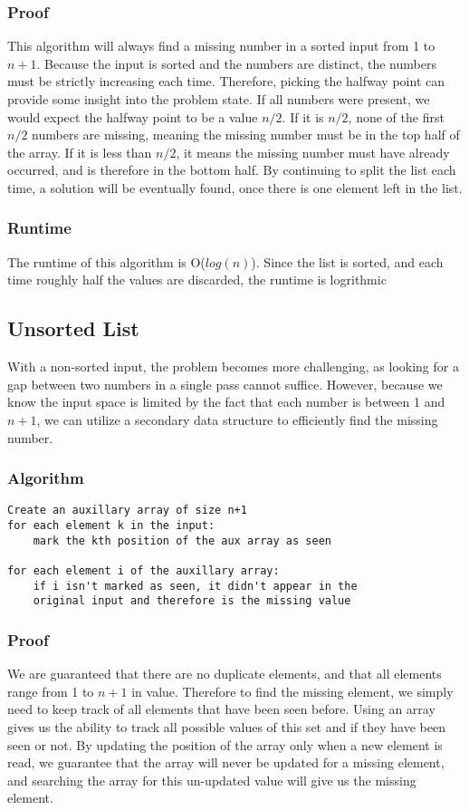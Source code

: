 \documentclass[titlepage]{article}
\numberwithin{equation}{subsection}
\begin{document}
\subsubsection{Proof}
This algorithm will always find a missing number in a sorted
input from 1 to $n + 1$. Because the input is sorted and the numbers are distinct, 
the numbers must be strictly increasing each time. Therefore, picking the 
halfway point can provide some insight into the problem state. If all
numbers were present, we would expect the halfway point to be a value $n/2$.
If it is $n/2$, none of the first $n/2$ numbers are missing, meaning the missing
number must be in the top half of the array. If it is less than $n/2$, it means the
missing number must have already occurred, and is therefore in the bottom half. By
continuing to split the list each time, a solution will be eventually found, once there
is one element left in the list.
\subsubsection{Runtime}
The runtime of this algorithm is O($log(n)$). Since the list is sorted,
and each time roughly half the values are discarded, the runtime is logrithmic
\subsection{Unsorted List}
With a non-sorted input, the problem becomes more challenging, as
looking for a gap between two numbers in a single pass cannot suffice.
However, because we know the input space is limited by the fact that
each number is between 1 and $n+1$, we can utilize a secondary data structure
to efficiently find the missing number.
\subsubsection{Algorithm}
\begin{minipage}{\linewidth}
\begin{lstlisting}
Create an auxillary array of size n+1
for each element k in the input:
    mark the kth position of the aux array as seen

for each element i of the auxillary array:
    if i isn't marked as seen, it didn't appear in the 
    original input and therefore is the missing value
\end{lstlisting}
\end{minipage}
\subsubsection{Proof}
We are guaranteed that there are no duplicate elements, and
that all elements range from 1 to $n+1$ in value. Therefore to
find the missing element, we simply need to keep track of all elements
that have been seen before. Using an array gives us the ability to track
all possible values of this set and if they have been seen or not. By
updating the position of the array only when a new element is read,
we guarantee that the array will never be updated for a missing element,
and searching the array for this un-updated value will give us the missing
element.
\end{document}
